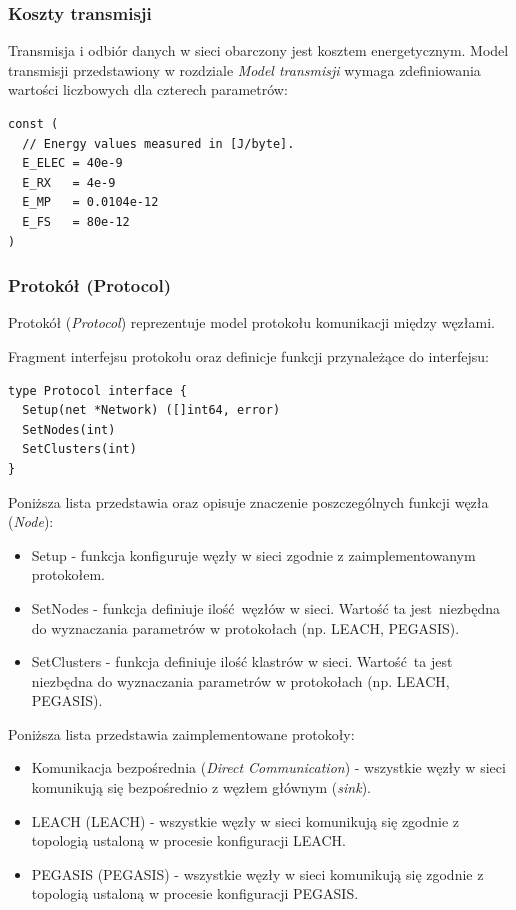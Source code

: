 \documentclass[a4paper,12pt,twoside,openany]{report}
\begin{document}
\subsubsection{Koszty transmisji}

Transmisja i odbiór danych w sieci obarczony jest kosztem energetycznym.
Model transmisji przedstawiony w rozdziale \textit{Model transmisji} wymaga zdefiniowania wartości liczbowych dla czterech parametrów:

\begin{lstlisting}
const (
  // Energy values measured in [J/byte].
  E_ELEC = 40e-9
  E_RX   = 4e-9
  E_MP   = 0.0104e-12
  E_FS   = 80e-12
)
\end{lstlisting}

\subsubsection{Protokół (Protocol)}

Protokół (\textit{Protocol}) reprezentuje model protokołu komunikacji między węzłami.

Fragment interfejsu protokołu oraz definicje funkcji przynależące do interfejsu:

\begin{lstlisting}
type Protocol interface {
  Setup(net *Network) ([]int64, error)
  SetNodes(int)
  SetClusters(int)
}
\end{lstlisting}

Poniższa lista przedstawia oraz opisuje znaczenie poszczególnych funkcji węzła (\textit{Node}):

\begin{itemize}
 \item Setup - funkcja konfiguruje węzły w sieci zgodnie z zaimplementowanym protokołem.
 \item SetNodes - funkcja definiuje ilość węzłów w sieci. Wartość ta jest niezbędna do wyznaczania parametrów w protokołach (np. LEACH, PEGASIS).
 \item SetClusters - funkcja definiuje ilość klastrów w sieci. Wartość ta jest niezbędna do wyznaczania parametrów w protokołach (np. LEACH, PEGASIS).
\end{itemize}

Poniższa lista przedstawia zaimplementowane protokoły:

\begin{itemize}
 \item Komunikacja bezpośrednia	(\textit{Direct Communication}) - wszystkie węzły w sieci komunikują się bezpośrednio z węzłem głównym (\textit{sink}).
 \item LEACH (LEACH) - wszystkie węzły w sieci komunikują się zgodnie z topologią ustaloną w procesie konfiguracji LEACH.
 \item PEGASIS (PEGASIS) - wszystkie węzły w sieci komunikują się zgodnie z topologią ustaloną w procesie konfiguracji PEGASIS.
\end{itemize}
\end{document}
